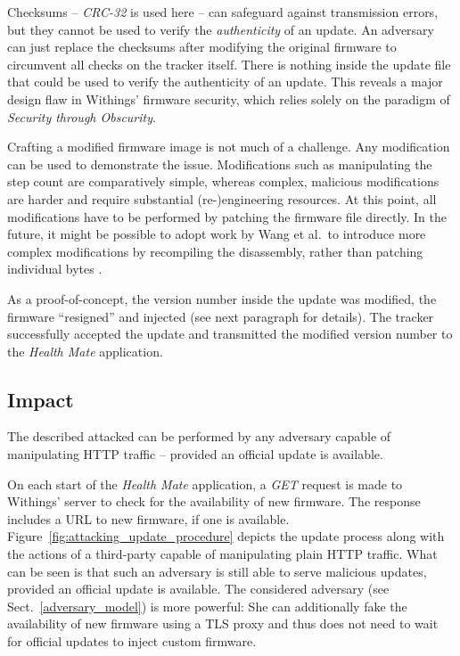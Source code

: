 \documentclass[english]{lni}
\begin{document}
Checksums -- \emph{CRC-32} is used here -- can safeguard against transmission errors, but they cannot be used to verify the \emph{authenticity} of an update.
An adversary can just replace the checksums after modifying the original firmware to circumvent all checks on the tracker itself. There is nothing inside the update file that could be used to verify the authenticity of an update. This reveals a major design flaw in Withings' firmware security, which relies solely on the paradigm of \emph{Security through Obscurity}.

Crafting a modified firmware image is not much of a challenge. Any modification can be used to demonstrate the issue. Modifications such as manipulating the step count are comparatively simple, whereas complex, malicious modifications are harder and require substantial (re-)engineering resources. At this point, all modifications have to be performed by patching the firmware file directly. In the future, it might be possible to adopt work by Wang et al.~to introduce more complex modifications by recompiling the disassembly, rather than patching individual bytes \cite{ReassembleableDisassembling}.

As a proof-of-concept, the version number inside the update was modified, the firmware ``resigned'' and injected (see next paragraph for details). The tracker successfully accepted the update and transmitted the modified version number to the \emph{Health Mate} application.

\subsection{Impact}
\label{impact}
The described attacked can be performed by any adversary capable of manipulating HTTP traffic -- provided an official update is available.

On each start of the \emph{Health Mate} application, a \emph{GET} request is made to Withings' server to check for the availability of new firmware. The response includes a URL to new firmware, if one is available. Figure~\ref{fig:attacking_update_procedure} depicts the update process along with the actions of a third-party capable of manipulating plain HTTP traffic. What can be seen is that such an adversary is still able to serve malicious updates, provided an official update is available. The considered adversary (see Sect.~\ref{adversary_model}) is more powerful: She can additionally fake the availability of new firmware using a TLS proxy and thus does not need to wait for official updates to inject custom firmware.
\end{document}
